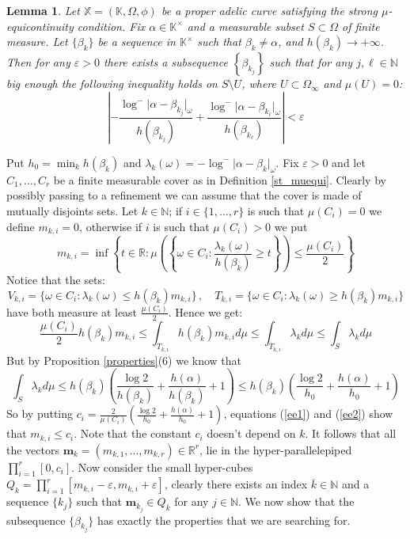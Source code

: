 \documentclass[10 pt,a4paper]{article}
\theoremstyle{plain}
\newtheorem{lem}[thm]{Lemma}
\theoremstyle{definition}
\theoremstyle{named}
\begin{document}
\begin{lem}\label{unif_conv}
Let $\mathbb X=(\mathbb K,\Omega, \phi)$ be a proper adelic curve satisfying the strong $\mu$-equicontinuity condition. Fix $\alpha\in \mathbb K^\times$ and a measurable subset $S\subset\Omega$ of finite measure. Let $\{\beta_k\}$ be a sequence in $\mathbb K^\times$ such that $\beta_k\neq\alpha$,  and $h(\beta_k)\to+\infty$. Then for any $\varepsilon>0$  there exists a subsequence $\left\{\beta_{k_j}\right\}$  such that for any $j,\ell\in\mathbb N$  big enough  the following inequality holds  on $S\setminus U$, where $U\subset\Omega_{\infty}$ and $\mu(U)=0$:
\[
\left\vert-\frac{\log^-\vert\alpha-\beta_{k_j}\vert_{\omega}}{h(\beta_{k_j})}+\frac{\log^-\vert\alpha-\beta_{k_{\ell}}\vert_{\omega}}{h(\beta_{k_{\ell}})} \right\vert<\varepsilon 
\]
\end{lem}
\proof 
Put $h_0=\min_k h(\beta_k)$ and $\lambda_k(\omega)=-\log^-\vert \alpha-\beta_k\vert_\omega$. Fix $\varepsilon>0$ and let $C_1,\ldots, C_r$ be a finite measurable cover as in Definition \ref{st_muequi}. Clearly by possibly passing to a refinement we can assume that the cover is made of mutually disjoints sets. Let $k\in\mathbb N$; if $i\in\{1,\ldots, r\}$ is such that $\mu(C_i)=0$ we define $m_{k,i}=0$, otherwise if $i$ is such that $\mu(C_i)>0$ we put 
\[
m_{k,i}=\inf\left\{t\in\mathbb R\colon \mu\left(\left\{\omega\in C_i\colon \frac{\lambda_k(\omega)}{h(\beta_k)}\ge t\right\}\right)\le \frac{\mu(C_i)}{2}\right\}
\]
Notice that the sets:
\[
V_{k,i}=\{\omega\in C_i\colon \lambda_k(\omega) \le h(\beta_k) m_{k,i}\}\,,\quad  T_{k,i}=\{\omega\in C_i\colon \lambda_k(\omega) \ge h(\beta_k) m_{k,i}\}
\]
have both measure at least $\frac{\mu(C_i)}{2}$. Hence we get:
\begin{equation}\label{ee1}
\frac{\mu(C_i)}{2} h(\beta_k) m_{k,i}\le \int_{T_{k,i}} h(\beta_k) m_{k,i} d\mu \le \int_{T_{k,i}} \lambda_k d\mu\le\int_S \lambda_k d\mu
\end{equation}
But by Proposition \ref{properties}(6) we know that
\begin{equation}\label{ee2}
\int_S \lambda_k d\mu\le h(\beta_k)\left(\frac{\log 2}{h(\beta_k)}+\frac{h(\alpha)}{h(\beta_k)}+1\right)\le h(\beta_k)\left(\frac{\log 2}{h_0}+\frac{h(\alpha)}{h_0}+1\right)
\end{equation}
So by putting $c_i=\frac{2}{\mu(C_i)}\left(\frac{\log 2}{h_0}+\frac{h(\alpha)}{h_0}+1\right)$, equations  (\ref{ee1}) and (\ref{ee2}) show that $m_{k,i}\le c_i$. Note that the constant $c_i$ doesn't depend on $k$. It follows that all the vectors $\bm{m}_{k}=(m_{k,1},\ldots, m_{k,r})\in\mathbb R^r$,   lie in the hyper-parallelepiped $\prod^r_{i=1}[0,c_i]$. Now consider the small hyper-cubes $Q_k=\prod^r_{i=1}[m_{k,i}-\varepsilon,m_{k,i}+\varepsilon]$, clearly there exists an index $\overline{k}\in\mathbb N$ and a sequence  $\{k_j\}$ such that $\bm{m}_{k_j}\in Q_{\overline k}$ for any $j\in\mathbb N$. We now show that the subsequence $\{\beta_{k_j}\}$ has exactly the properties that we are searching for.
\end{document}

